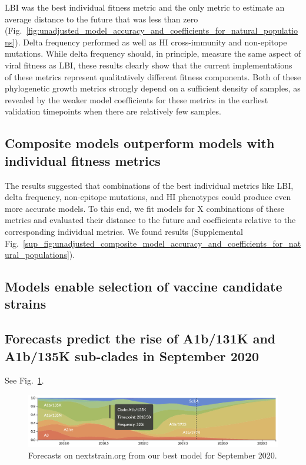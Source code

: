 LBI was the best individual fitness metric and the only metric to estimate an average distance to the future that was less than zero (Fig.~\ref{fig:unadjusted_model_accuracy_and_coefficients_for_natural_populations}).
Delta frequency performed as well as HI cross-immunity and non-epitope mutations.
While delta frequency should, in principle, measure the same aspect of viral fitness as LBI, these results clearly show that the current implementations of these metrics represent qualitatively different fitness components.
Both of these phylogenetic growth metrics strongly depend on a sufficient density of samples, as revealed by the weaker model coefficients for these metrics in the earliest validation timepoints when there are relatively few samples.

\subsection*{Composite models outperform models with individual fitness metrics}

The results suggested that combinations of the best individual metrics like LBI, delta frequency, non-epitope mutations, and HI phenotypes could produce even more accurate models.
To this end, we fit models for X combinations of these metrics and evaluated their distance to the future and coefficients relative to the corresponding individual metrics.
We found results (Supplemental Fig.~\ref{sup_fig:unadjusted_composite_model_accuracy_and_coefficients_for_natural_populations}).

\subsection*{Models enable selection of vaccine candidate strains}

\subsection*{Forecasts predict the rise of A1b/131K and A1b/135K sub-clades in September 2020}

See Fig.~\ref{fig:nextstrain_forecasts}.

\begin{figure}[t]
  \begin{center}
  \includegraphics[width=\textwidth]{figures/nextstrain-forecasts-for-september-2020.png}
  \caption{Forecasts on nextstrain.org from our best model for September 2020.}
  \label{fig:nextstrain_forecasts}
  \end{center}
\end{figure}

